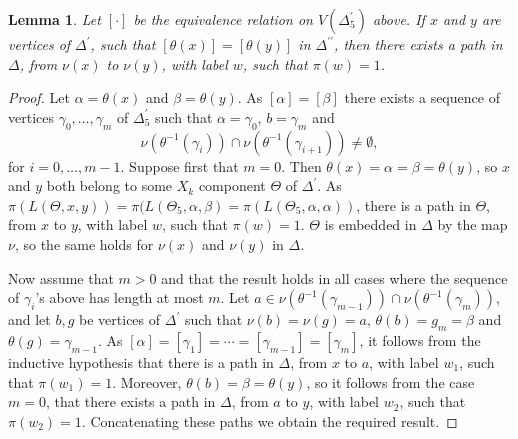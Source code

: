 \documentclass[a4paper,12pt]{article}
\renewcommand{\a}{\alpha }
\renewcommand{\b}{\beta }
\newcommand{\g}{\gamma }
\newcommand{\D}{\Delta }
\newcommand{\nul}{\emptyset }
\newtheorem{lemma}[theorem]{Lemma}
\numberwithin{equation}{section}
\numberwithin{figure}{section}
\begin{document}
\begin{lemma}\label{lem:idverts}
Let $[\cdot]$ be the equivalence relation on $V(\D^\prime_5)$ above.
If $x$ and $y$ are vertices of $\D^\prime$, such that
$[\theta(x)]=[\theta(y)]$ in $\D^{\prime\prime}$, then
there exists a path in $\D$, from $\nu(x)$ to $\nu(y)$, with label $w$,
such that $\pi(w)=1$.
\end{lemma}
\begin{proof}
Let $\a=\theta(x)$ and $\b=\theta(y)$. As $[\a]=[\b]$ there exists a
sequence of vertices $\g_0,\ldots ,\g_m$ of $\D^\prime_5$ such that
$\a=\g_0$, $b=\g_m$ and
\[\nu(\theta^{-1}(\g_i))\cap \nu(\theta^{-1}(\g_{i+1}))\neq \nul,\]
for $i=0,\ldots, m-1$. Suppose first that $m=0$. Then $\theta(x)=
\a=\b=\theta(y)$, so $x$ and $y$ both belong to some $X_k$ component
$\Theta$ of $\D^\prime$. As $\pi(L(\Theta,x,y))=\pi(L(\Theta_5, \a,\b)
=\pi(L(\Theta_5,\a,\a))$, there is a path in $\Theta$, from $x$ to $y$,
with label $w$, such that $\pi(w)=1$. $\Theta$ is embedded in $\D$ by the
map $\nu$, so the same holds for $\nu(x)$ and $\nu(y)$ in $\D$.

Now assume that $m>0$ and that the result holds in all cases where the
sequence of $\g_i$'s above has length at most  $m$. Let
$a\in  \nu(\theta^{-1}(\g_{m-1}))\cap \nu(\theta^{-1}(\g_{m}))$, and let
$b,g$ be vertices of $\D^\prime$ such that $\nu(b)=\nu(g)=a$,
$\theta(b)=g_m=\b$ and $\theta(g)=\g_{m-1}$. As $[\a]=[\g_1]=\cdots
=[\g_{m-1}]=[\g_m]$, it follows from the inductive hypothesis that
there is a path in $\D$, from $x$ to $a$, with label $w_1$, such
that $\pi(w_1)=1$. Moreover, $\theta(b)=\b=\theta(y)$, so it follows from
the case $m=0$, that there exists a path in $\D$, from $a$ to $y$,
with label $w_2$, such that $\pi(w_2)=1$. Concatenating these paths we
obtain the required result.
\end{proof}
\end{document}
